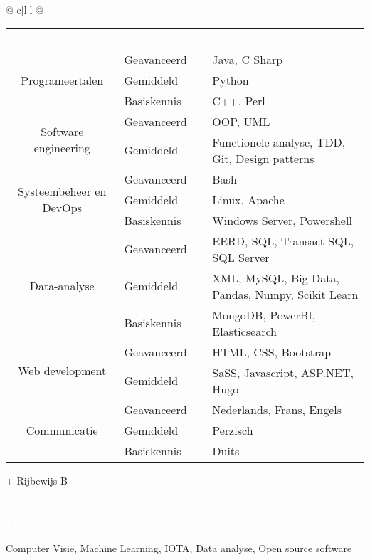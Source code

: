 \documentclass[a4paper, twoside]{article}
\begin{document}
\begin{tabu}{@{} c|l|l @{}}
\begin{tabular}{c|l|l @{}}
\cellcolor{blueDark}\textcolor{white}{\textbf{ Domein }} &
\cellcolor{blueDark}\textcolor{white}{\textbf{ Kennisniveau }} &
\cellcolor{blueDark}\\
\multirow{ 3 }{*}{ Programeertalen }
& Geavanceerd & Java, C Sharp \\
& Gemiddeld & Python \\
& Basiskennis & C++, Perl \\
\hline
\multirow{ 2 }{*}{ Software engineering }
& Geavanceerd & OOP, UML \\
& Gemiddeld & Functionele analyse, TDD, Git, Design patterns \\
\hline
\multirow{ 3 }{*}{ Systeembeheer en DevOps }
& Geavanceerd & Bash \\
& Gemiddeld & Linux, Apache \\
& Basiskennis & Windows Server, Powershell \\
\hline
\multirow{ 3 }{*}{ Data-analyse }
& Geavanceerd & EERD, SQL, Transact-SQL, SQL Server \\
& Gemiddeld & XML, MySQL, Big Data, Pandas, Numpy, Scikit Learn \\
& Basiskennis & MongoDB, PowerBI, Elasticsearch \\
\hline
\multirow{ 2 }{*}{ Web development }
& Geavanceerd & HTML, CSS, Bootstrap \\
& Gemiddeld & SaSS, Javascript, ASP.NET, Hugo \\
\hline
\multirow{ 3 }{*}{ Communicatie }
& Geavanceerd & Nederlands, Frans, Engels \\
& Gemiddeld & Perzisch \\
& Basiskennis & Duits \\
\hline
\end{tabular}
\end{tabu}
\ignorespaces
\noindent + Rijbewijs B
\begin{mdframed}
\section*{\textcolor{white}{ Interesses }}
\end{mdframed}
\noindent
Computer Visie, Machine Learning, IOTA, Data analyse, Open source software
\end{document}
